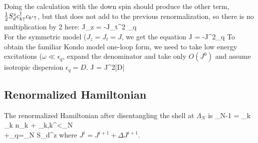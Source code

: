 \documentclass[14pt]{extarticle}
\numberwithin{equation}{section}
\begin{document}
\eeq
Doing the calculation with the down spin should produce the other term, \(\frac{1}{2} S_d^z c^\dagger_{k\uparrow}c_{k^\prime\uparrow}\), but that does not add to the previous renormalization, so there is no multiplication by 2 here:
\beq
\Delta J_z = -J_t^2 \sum_{q} \\
\eeq
For the symmetric model (\(J_z = J_t = J\), we get the equation
\beq
\Delta J = -J^2\sum_{q}
\eeq
To obtain the familiar Kondo model one-loop form, we need to take low energy excitations (\(\omega \ll \epsilon_q\), expand the denominator and take only \(O(J^0)\) and assume isotropic dispersion \(\epsilon_q = D\).
\beq
\delta J = J^2\rho |\delta D|
\eeq

\subsection{Renormalized Hamiltonian}
The renormalized Hamiltonian after disentangling the shell at \(\Lambda_N\) is
\beq
\ham_{N-1} = \sum_{k\sigma} \epsilon_k \hat n_{k\sigma} + \sum_{k,k^\prime<\Lambda_N}\\
+\sum_{q=\Lambda_N} S_d^z
\eeq
where \(J^i = J^{i+1} + \Delta J^{i+1}\).
\end{document}
